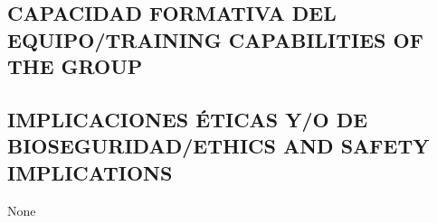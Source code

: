 \documentclass[a4paper,11pt,oneside]{article}
\begin{document}
\subsection{\sc CAPACIDAD FORMATIVA DEL EQUIPO/TRAINING CAPABILITIES OF THE GROUP}

%
%
%
%

\subsection{\sc IMPLICACIONES ÉTICAS Y/O DE BIOSEGURIDAD/ETHICS AND SAFETY IMPLICATIONS}

None
\end{document}
